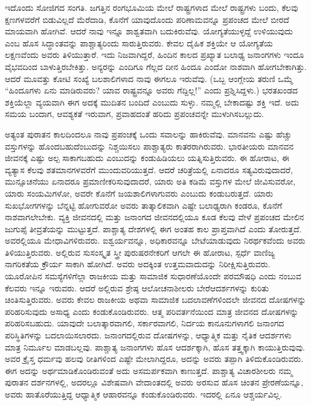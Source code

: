 ಇದೊಂದು ಸೋಜಿಗದ ಸಂಗತಿ. ಜಗತ್ತಿನ ರಂಗಭೂಮಿಯ ಮೇಲೆ ರಾಷ್ಟ್ರಗಳಾದ ಮೇಲೆ ರಾಷ್ಟ್ರಗಳು ಬಂದು, ಕೆಲವು ಕ್ಷಣಗಳವರೆಗೆ ಬಿಡುವಿಲ್ಲದೆ ಮೆರೆದಾಡಿ, ಕೊನೆಗೆ ಯಾವುದೊಂದು ಪರಿಣಾಮವನ್ನೂ ಪ್ರಪಂಚದ ಮೇಲೆ ಬೀರದೆ ಮಾಯವಾಗಿ ಹೋಗಿವೆ. ಆದರೆ ನಾವು ಇನ್ನೂ ಶಾಶ್ವತವಾಗಿ ಬದುಕಿರುವೆವು. ಯೋಗ್ಯತೆಯುಳ್ಳದ್ದೆ ಉಳಿಯುವುದು ಎಂಬ ಹೊಸ ಸಿದ್ಧಾಂತವನ್ನು ಪಾಶ್ಚಾತ್ಯರಿಂದು ಸಾರುತ್ತಿರುವರು. ಕೇವಲ ದೈಹಿಕ ಶಕ್ತಿಯೇ ಆ ಯೋಗ್ಯತೆಯ ಲಕ್ಷಣವೆಂದು ಅವರು ತಿಳಿಯುತ್ತಾರೆ. ಇದು ನಿಜವಾಗಿದ್ದರೆ, ಹಿಂದಿನ ಕಾಲದ ಪ್ರಖ್ಯಾತ ಬಲಾಢ್ಯ ಜನಾಂಗಗಳು ಇಂದೂ ವೈಭವದಿಂದ ಬಾಳುತ್ತಿರಬೇಕಿತ್ತು. ಅನ್ಯರನ್ನು ಎಂದಿಗೂ ಗೆಲ್ಲದ ದೀನ ಹಿಂದೂ ಎಂದೋ ನಾಶವಾಗಿ ಹೋಗಬೇಕಾಗಿತ್ತು. ಆದರೆ ಮೂವತ್ತು ಕೋಟಿ ಸಂಖ್ಯೆ ಬಲಶಾಲಿಗಳಾದ ನಾವು ಈಗಲೂ ಇರುವೆವು. (ಒಬ್ಬ ಆಂಗ್ಲೇಯ ತರುಣಿ ಒಮ್ಮೆ “ಹಿಂದೂಗಳು ಏನು ಮಾಡಿರುವರು? ಯಾವ ರಾಷ್ಟ್ರವನ್ನೂ ಅವರು ಗೆದ್ದಿಲ್ಲ!” ಎಂದು ಪ್ರಶ್ನಿಸಿದ್ದಳು.) ಭರತಖಂಡದ ಶಕ್ತಿಯೆಲ್ಲಾ ವ್ಯಯವಾಗಿ ಈಗ ಅದಕ್ಕೆ ಮುದಿತನ ಬಂದಿದೆ ಎಂಬುದು ಸುಳ್ಳು. ನಮ್ಮಲ್ಲಿ ಬೇಕಾದಷ್ಟು ಶಕ್ತಿ ಇದೆ. ಅದು ಸಮಯ ಬಂದಾಗ, ಆವಶ್ಯಕತೆ ಇರುವಾಗ, ಪ್ರವಾಹದಂತೆ ಹರಿದು ಪ್ರಪಂಚವನ್ನೇ ಮುಳುಗಿಸಬಲ್ಲುದು.

ಅತ್ಯಂತ ಪುರಾತನ ಕಾಲದಿಂದಲೂ ನಾವು ಪ್ರಪಂಚಕ್ಕೆ ಒಂದು ಸವಾಲನ್ನು ಹಾಕಿರು\-ವೆವು. ಮಾನವನು ಎಷ್ಟು ಹೆಚ್ಚು ವಸ್ತುಗಳನ್ನು ಹೊಂದಬಹುದೆಂಬುದನ್ನು ನಿಶ್ಚಯಿಸಲು ಪಾಶ್ಚಾತ್ಯರು ಕಾತರರಾಗಿರುವರು. ಭಾರತೀಯರು ಮಾನವನ ಜೀವನಕ್ಕೆ ಎಷ್ಟು ಅಲ್ಪ ಸಾಕಾಗಬಹುದು ಎಂಬುದನ್ನು ಕಂಡುಹಿಡಿಯಲು ಯತ್ನಿಸುತ್ತಿರುವರು. ಈ ಹೋರಾಟ, ಈ ವ್ಯತ್ಯಾಸ ಕೆಲವು ಶತಮಾನಗಳವರೆಗೆ ಮುಂದುವರಿಯುತ್ತದೆ. ಆದರೆ ಚರಿತ್ರೆಯಲ್ಲಿ ಏನಾದರೂ ಸತ್ಯವಿರುವುದಾದರೆ, ಮುನ್ಸೂಚನೆಯು ಏನಾದರೂ ಪ್ರಮಾಣೀಕರಿಸುವುದಾದರೆ, ಯಾರು ಅತಿ ಕಡಿಮೆ ವಸ್ತುಗಳ ಮೇಲೆ ಜೀವಿಸುವರೋ, ಯಾರು ಸಂಯಮಿಗಳೋ, ಅವರೇ ಕೊನೆಗೆ ಜಯಶಾಲಿಗಳಾಗುವರು ಎಂಬುದು ಕಂಡುಬರುತ್ತದೆ. ಯಾರು ಸುಖಭೋಗಗಳನ್ನು ಬೆನ್ನಟ್ಟಿ ಹೋಗುವರೋ ಅವರು ತಾತ್ಕಾಲಿಕವಾಗಿ ಎಷ್ಟೇ ಬಲಾಢ್ಯರಾಗಿ ಕಂಡರೂ, ಕೊನೆಗೆ ನಾಶವಾಗಲೇಬೇಕು. ವ್ಯಕ್ತಿ ಜೀವನದಲ್ಲಿ ಮತ್ತು ಜನಾಂಗದ ಜೀವನದಲ್ಲಿಯೂ ಕೂಡ ಕೆಲವು ವೇಳೆ ಪ್ರಪಂಚದ ಮೇಲಿನ ಜುಗುಪ್ಸೆ ತೀವ್ರತೆಯನ್ನು ಮುಟ್ಟುತ್ತದೆ. ಪಾಶ್ಚಾತ್ಯ ದೇಶಗಳಲ್ಲಿ ಈಗ ಅಂತಹ ಕಾಲ ಪ್ರಾಪ್ತವಾಗಿದೆ ಎಂದು ತೋರುತ್ತದೆ. ಅವರಲ್ಲಿಯೂ ಮೇಧಾವಿಗಳಿರುವರು. ಐಶ್ವರ್ಯವನ್ನೂ, ಅಧಿಕಾರವನ್ನೂ ಬೇಟೆಯಾಡುವುದು ನಿರರ್ಥಕವೆಂದು ಅವರು ತಿಳಿಯುತ್ತಿರುವರು. ಅಲ್ಲಿರುವ ಸುಸಂಸ್ಕೃತ ಸ್ತ್ರೀ ಪುರುಷರನೇಕರಿಗೆ ಆಗಲೇ ಈ ಹೋರಾಟ, ಸ್ಪರ್ಧೆ ವಾಣಿಜ್ಯ ನಾಗರಿಕತೆಯ ಕ್ರೌರ್ಯ ಸಾಕಾಗಿ ಹೋಗಿದೆ. ಅವರು ಅದಕ್ಕಿಂತ ಉತ್ತಮವಾದುದನ್ನು ನಿರೀಕ್ಷಿಸುತ್ತಿರುವರು. ಯೂರೋಪಿನ ಸಮಸ್ಯೆಗಳಿಗೆಲ್ಲಾ ರಾಜಕೀಯ ಮತ್ತು ಸಾಮಾಜಿಕ ಸುಧಾರಣೆಯೊಂದೇ ಪರಮೌಷಧಿ ಎಂದು ನಂಬುವ ಕೆಲವರು ಇನ್ನೂ ಇರುವರು. ಆದರೆ ಅಲ್ಲಿರುವ ಶ್ರೇಷ್ಠ ಆಲೋಚನಾಶೀಲರು ಬೇರೆ\break ಆದರ್ಶಗಳನ್ನು ಕುರಿತು ಚಿಂತಿಸುತ್ತಿರುವರು. ಅವರು ಕೇವಲ ರಾಜಕೀಯ ಅಥವಾ ಸಾಮಾಜಿಕ ಬದಲಾವಣೆಗಳಿಂದಲೇ ಜೀವನದ ದೋಷಗಳನ್ನು ಪರಿಹರಿಸುವುದು ಅಸಾಧ್ಯ ಎಂದು ಕಂಡುಕೊಂಡಿರುವರು. ಆತ್ಮ ಪರಿವರ್ತನೆಯಿಂದ ಮಾತ್ರ ಜೀವನದ ದೋಷಗಳನ್ನು ಪರಿಹರಿಸಬಹುದು. ಯಾವುದೇ ಬಲಾತ್ಕಾರವಾಗಲಿ, ಸರ್ಕಾರವಾಗಲಿ, ನಿರ್ದಯ ಕಾನೂನುಗಳಾಗಲಿ ಜನಾಂಗದ ಪರಿಸ್ಥಿತಿಗಳನ್ನು ಬದಲಾಯಿಸಲಾರದು. ಜನಾಂಗದಲ್ಲಿರುವ ದೋಷಗಳನ್ನು, ಆಧ್ಯಾತ್ಮಿಕ ಮತ್ತು ನೈತಿಕ ಆದರ್ಶಗಳು ಮಾತ್ರ ನಿರ್ಮೂಲ ಮಾಡಬಲ್ಲವು. ಪಾಶ್ಚಾತ್ಯ ಜನಾಂಗಗಳು ಹೊಸ ಆದರ್ಶಕ್ಕಾಗಿ, ಹೊಸ ತತ್ತ್ವಕ್ಕಾಗಿ ಕಾಯುತ್ತಿರುವುವು. ಅವರ ಕ್ರೈಸ್ತ ಧರ್ಮವು ಹಲವು ರೀತಿಗಳಿಂದ ಎಷ್ಟೇ ಮೇಲಾಗಿದ್ದರೂ, ಅದನ್ನು ಅವರು ತಪ್ಪಾಗಿ ತಿಳಿದುಕೊಂಡಿರುವರು. ಈಗ ಅದನ್ನು ಅರ್ಥಮಾಡಿಕೊಂಡಿರುವಂತೆ ಅದು ಅಸಮರ್ಪಕವಾಗಿ ಕಾಣುತ್ತದೆ. ಪಾಶ್ಚಾತ್ಯ ವಿಚಾರಶೀಲರು ನಮ್ಮ ಪುರಾತನ ದರ್ಶನಗಳಲ್ಲಿ, ಅದರಲ್ಲೂ ವಿಶೇಷವಾಗಿ ವೇದಾಂತದಲ್ಲಿ ಅವರು ಅರಸುವ ಹೊಸ ಚಿಂತನ ಪ್ರೇರಣೆಯನ್ನೂ, ಅವರು ಹಾತೊರೆಯುತ್ತಿದ್ದ ಆಧ್ಯಾತ್ಮಿಕ ಆಹಾರವನ್ನೂ ಕಂಡುಕೊಂಡಿರುವರು. ಇದರಲ್ಲಿ ಏನೂ ಆಶ್ಚರ್ಯವಿಲ್ಲ.


